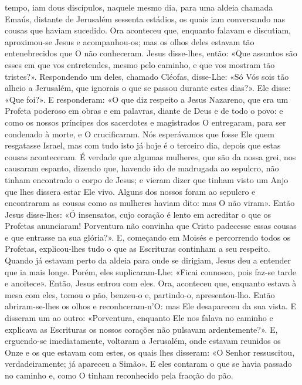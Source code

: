 \begin{paracol}{2}
{ tempo, iam dous discípulos, naquele mesmo dia, para uma aldeia chamada Emaús, distante de Jerusalém sessenta estádios, os quais iam conversando nas cousas que haviam sucedido. Ora aconteceu que, enquanto falavam e discutiam, aproximou-se Jesus e acompanhou-os; mas os olhos deles estavam tão entenebrecidos que O não conheceram. Jesus disse-lhes, então: «Que assuntos são esses em que vos entretendes, mesmo pelo caminho, e que vos mostram tão tristes?». Respondendo um deles, chamado Cléofas, disse-Lhe: «Só Vós sois tão alheio a Jerusalém, que ignorais o que se passou durante estes dias?». Ele disse: «Que foi?». E responderam: «O que diz respeito a Jesus Nazareno, que era um Profeta poderoso em obras e em palavras, diante de Deus e de todo o povo: e como os nossos príncipes dos sacerdotes e magistrados O entregaram, para ser condenado à morte, e O crucificaram. Nós esperávamos que fosse Ele quem resgatasse Israel, mas com tudo isto já hoje é o terceiro dia, depois que estas cousas aconteceram. É verdade que algumas mulheres, que são da nossa grei, nos causaram espanto, dizendo que, havendo ido de madrugada ao sepulcro, não tinham encontrado o corpo de Jesus; e vieram dizer que tinham visto um Anjo que lhes dissera estar Ele vivo. Alguns dos nossos foram ao sepulcro e encontraram as cousas como as mulheres haviam dito: mas O não viram». Então Jesus disse-lhes: «Ó insensatos, cujo coração é lento em acreditar o que os Profetas anunciaram! Porventura não convinha que Cristo padecesse essas cousas e que entrasse na sua glória?». E, começando em Moisés e percorrendo todos os Profetas, explicou-lhes tudo o que as Escrituras continham a seu respeito. Quando já estavam perto da aldeia para onde se dirigiam, Jesus deu a entender que ia mais longe. Porém, eles suplicaram-Lhe: «Ficai connosco, pois faz-se tarde e anoitece». Então, Jesus entrou com eles. Ora, aconteceu que, enquanto estava à mesa com eles, tomou o pão, benzeu-o e, partindo-o, apresentou-lho. Então abriram-se-lhes os olhos e reconhceram-n’O: mas Ele desapareceu da sua vista. E disseram um ao outro: «Porventura, enquanto Ele nos falava no caminho e explicava as Escrituras os nossos corações não pulsavam ardentemente?». E, erguendo-se imediatamente, voltaram a Jerusalém, onde estavam reunidos os Onze e os que estavam com estes, os quais lhes disseram: «O Senhor ressuscitou, verdadeiramente; já apareceu a Simão». E eles contaram o que se havia passado no caminho e, como O tinham reconhecido pela fracção do pão.
}\end{paracol}


